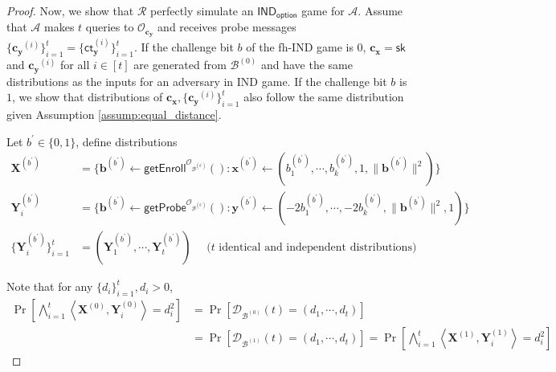\begin{proof}
Now, we show that $\mathcal{R}$ perfectly simulate an $\textsf{IND}_{\textsf{option}}$ game for $\mathcal{A}$. Assume that $\mathcal{A}$ makes $t$ queries to $\mathcal{O}_{\mathbf{c_y}}$ and receives probe messages $\{ \mathbf{c_y}^{(i)} \}_{i=1}^t = \{ \textsf{ct}_{\mathbf{y}}^{(i)} \}_{i=1}^t$. If the challenge bit $b$ of the \textsf{fh-IND} game is $0$, $\mathbf{c_x} = \textsf{sk}$ and $\mathbf{c_y}^{(i)}$ for all $i \in [t]$ are generated from $\mathcal{B}^{(0)}$ and have the same distributions as the inputs for an adversary in \textsf{IND} game.
If the challenge bit $b$ is $1$, we show that distributions of $\mathbf{c_x}, \{ \mathbf{c_y}^{(i)} \}_{i=1}^t$ also follow the same distribution given Assumption \ref{assump:equal_distance}.

Let $b^\prime \in \{0, 1\}$, define distributions 
\begin{align*}
	\mathbf{X}^{(b^\prime)} &= \{ \mathbf{b}^{(b^\prime)} \gets \textsf{getEnroll}^{\mathcal{O}_{\mathcal{B}^{(b^\prime)}}}() : \mathbf{x}^{(b^{\prime})} \gets (b_1^{(b^{\prime})}, \cdots, b_k^{(b^{\prime})}, 1, \|\mathbf{b}^{ (b^{\prime}) }\|^2) \} \\
	\mathbf{Y}^{ (b^\prime) }_i &= \{ \mathbf{b}^{(b^\prime)} \gets \textsf{getProbe}^{\mathcal{O}_{\mathcal{B}^{(b^\prime)}}}() : \mathbf{y}^{(b^{\prime})} \gets ( -2b_1^{(b^{\prime})}, \cdots, -2b_k^{(b^{\prime})}, \|\mathbf{b}^{ (b^{\prime}) }\|^2, 1) \} \\
	\{ \mathbf{Y}^{ (b^\prime) }_i \}_{i=1}^t &= (\mathbf{Y}^{ (b^\prime) }_1, \cdots, \mathbf{Y}^{ (b^\prime) }_t) \quad  \text{ ($t$ identical and independent distributions) }
\end{align*}

\noindent Note that for any $\{ d_i \}_{i=1}^t, d_i > 0$,
\begin{align*}
\Pr \left[ \bigwedge_{i=1}^t \left\langle \mathbf{X}^{(0)}, {\mathbf{Y}^{(0)}_i} \right\rangle = d_i^2 \right] 
&= \Pr \left[ \mathcal{D}_{\mathcal{B}^{(0)}}(t) = (d_1, \cdots, d_t) \right] \\
&= \Pr \left[ \mathcal{D}_{\mathcal{B}^{(1)}}(t) = (d_1, \cdots, d_t) \right] = \Pr \left[ \bigwedge_{i=1}^t \left\langle \mathbf{X}^{(1)}, {\mathbf{Y}^{(1)}_i} \right\rangle = d_i^2 \right]
\end{align*}


\end{proof}
